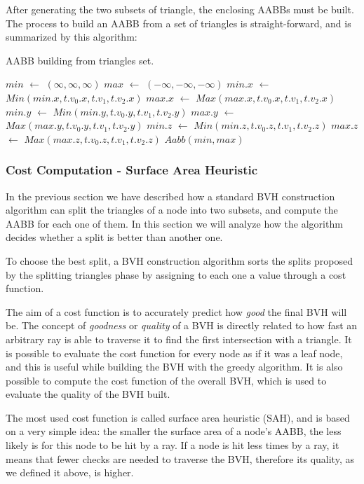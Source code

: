 \documentclass{PoliMi_MasterThesis}
\newcommand*\Let[2]{\State #1 $\gets$ #2}
\begin{document}
After generating the two subsets of triangle, the enclosing AABBs must be built. The process to build an AABB from a set of triangles is straight-forward, and is summarized by this algorithm:
\begin{algorithm}[H]
	\caption{AABB building from triangles set.}
	\begin{algorithmic}[1]
		\Let{$min$}{$(\infty,\infty,\infty)$}
		\Let{$max$}{$(-\infty,-\infty,-\infty)$}
			\Let{$min.x$}{$Min(min.x, t.v_0.x, t.v_1, t.v_2.x)$}
			\Let{$max.x$}{$Max(max.x, t.v_0.x, t.v_1, t.v_2.x)$}
			\Let{$min.y$}{$Min(min.y, t.v_0.y, t.v_1, t.v_2.y)$}
			\Let{$max.y$}{$Max(max.y, t.v_0.y, t.v_1, t.v_2.y)$}
			\Let{$min.z$}{$Min(min.z, t.v_0.z, t.v_1, t.v_2.z)$}
			\Let{$max.z$}{$Max(max.z, t.v_0.z, t.v_1, t.v_2.z)$}
		\EndFor
		\State \Return $Aabb(min, max)$
		\EndFunction
	\end{algorithmic}
	\label{alg:aabb_creation}
\end{algorithm} 

\subsubsection{Cost Computation - Surface Area Heuristic} \label{ssec:cost_computation}
In the previous section we have described how a standard BVH construction algorithm can split the triangles of a node into two subsets, and compute the AABB for each one of them. In this section we will analyze how the algorithm decides whether a split is better than another one.

To choose the best split, a BVH construction algorithm sorts the splits proposed by the splitting triangles phase by assigning to each one a value through a cost function. 

The aim of a cost function is to accurately predict how \textit{good} the final BVH will be. The concept of \textit{goodness} or \textit{quality} of a BVH is directly related to how fast an arbitrary ray is able to traverse it to find the first intersection with a triangle. It is possible to evaluate the cost function for every node as if it was a leaf node, and this is useful while building the BVH with the greedy algorithm. It is also possible to compute the cost function of the overall BVH, which is used to evaluate the quality of the BVH built.

The most used cost function is called surface area heuristic (SAH), and is based on a very simple idea: the smaller the surface area of a node's AABB, the less likely is for this node to be hit by a ray. If a node is hit less times by a ray, it means that fewer checks are needed to traverse the BVH, therefore its quality, as we defined it above, is higher.
\end{document}
